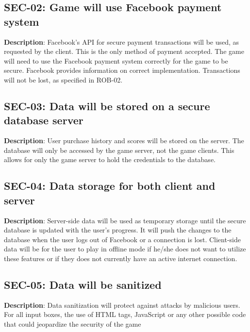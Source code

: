 \subsection{SEC-02: Game will use Facebook payment system}
\textbf{Description}: Facebook\textquoteright{}s API for secure payment transactions
will be used, as requested by the client. This is the only method
of payment accepted. The game will need to use the Facebook payment
system correctly for the game to be secure. Facebook provides information
on correct implementation. Transactions will not be lost, as specified
in ROB-02.

\subsection{SEC-03: Data will be stored on a secure database server}
\textbf{Description}: User purchase history and scores will be stored on the
server. The database will only be accessed by the game server, not
the game clients. This allows for only the game server to hold the
credentials to the database. 

\subsection{SEC-04: Data storage for both client and server}
\textbf{Description}: Server-side data will be used as temporary storage until
the secure database is updated with the user\textquoteright{}s progress.
It will push the changes to the database when the user logs out of
Facebook or a connection is lost. Client-side data will be for the
user to play in offline mode if he/she does not want to utilize these
features or if they does not currently have an active internet connection.

\subsection{SEC-05: Data will be sanitized}
\textbf{Description}: Data sanitization will protect against attacks by malicious
users. For all input boxes, the use of HTML tags, JavaScript or any
other possible code that could jeopardize the security of the game
